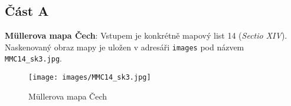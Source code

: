 \subsection*{Část A}

\textbf{Müllerova mapa Čech}: Vstupem je konkrétně mapový list 14 (\textit{Sectio XIV}). Naskenovaný obraz mapy je uložen v adresáři \texttt{images} pod názvem \texttt{MMC14\_sk3.jpg}.

\begin{figure}[H]
    \centering
    \texttt{[image: images/MMC14\_sk3.jpg]}
    \caption{Müllerova mapa Čech}
\end{figure}